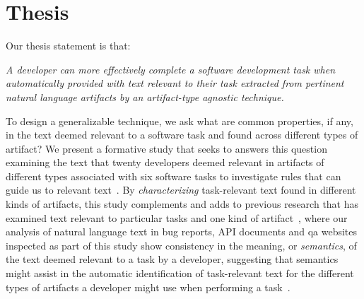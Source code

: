 

\section{Thesis}
\label{cp1:thesis}




Our thesis statement is that:




\bigskip
\begin{bluequote}
    \textit{A developer can more effectively complete a software development task when automatically provided with text relevant to their task extracted from pertinent natural language artifacts
    by an artifact-type agnostic technique.}
\end{bluequote}
\medskip



To design a generalizable technique, we ask what are common properties, if any, in the text deemed relevant to a software task and found across different types of artifact?
We present a formative study that seeks to answers this question 
examining the text that twenty developers deemed relevant in artifacts 
of different types associated with six software tasks to investigate 
rules that can guide us to relevant text~\cite{Kintsch1978a}.
By \textit{characterizing} task-relevant text found in different kinds of artifacts,
this study complements and adds to previous research that has
examined text relevant to particular tasks and one kind of artifact~\cite{Ko2006, Rastkar2010, Chaparro2017, Robillard2015},
where our analysis of natural language text  in bug
reports, API documents and \ac{qa} websites 
inspected as part of this study 
 show consistency in the meaning, or \textit{semantics}, of the
 text deemed relevant to a task by a developer, suggesting that 
semantics might assist in the automatic identification of
task-relevant text for the different types of artifacts a developer 
might use when performing a task~\cite{Meyer2019, Li2013}.



